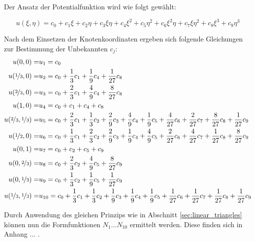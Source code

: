Der Ansatz der Potentialfunktion wird wie folgt gewählt:

\begin{equation}
\label{eq:cubic_triangle_eq}
u(\xi, \eta) = c_0 + c_1 \xi + c_2 \eta + c_3 \xi \eta + c_4 \xi^2 + c_5 \eta^2 + c_6 \xi^2 \eta + c_7 \xi \eta^2 + c_8 \xi^3 + c_9 \eta^3
\end{equation}	



Nach dem Einsetzen der Knotenkoordinaten ergeben sich folgende Gleichungen zur Bestimmung der Unbekannten $c_j$:
\begin{align}
u(0,0) = &u_1 = c_0\\
u(\nicefrac{1}{3}, 0) = &u_2 = c_0 + \frac{1}{3} c_1 + \frac{1}{9} c_4 +  \frac{1}{27} c_8\nonumber \\
u(\nicefrac{2}{3}, 0) = &u_3 = c_0 + \frac{2}{3} c_1 + \frac{4}{9} c_4 +  \frac{8}{27} c_8\nonumber \\
u(1,0) = &u_4 = c_0 + c_1 + c_4 + c_8\nonumber\\
u(\nicefrac{2}{3}, \nicefrac{1}{3}) = &u_5 = c_0 + \frac{2}{3} c_1 +  \frac{1}{3} c_2 + \frac{2}{9} c_3 +  \frac{4}{9} c_4 + \frac{1}{9} c_5 + \frac{4}{27} c_6 + \frac{2}{27} c_7 + \frac{8}{27} c_8 + \frac{1}{27} c_9\nonumber\\
u(\nicefrac{1}{2}, 0) = &u_6 = c_0 + \frac{1}{3} c_1 +  \frac{2}{3} c_2 + \frac{2}{9} c_3 +  \frac{1}{9} c_4 + \frac{4}{9} c_5 + \frac{2}{27} c_6 + \frac{4}{27} c_7 + \frac{1}{27} c_8 + \frac{8}{27} c_9\nonumber\\
u(0,1) = &u_7 = c_0 + c_2 + c_5 + c_9\nonumber\\
u(0, \nicefrac{2}{3}) = &u_8 = c_0 + \frac{2}{3} c_2 + \frac{4}{9} c_5 +  \frac{8}{27} c_9\nonumber \\
u(0, \nicefrac{1}{3}) = &u_9 = c_0 + \frac{1}{3} c_2 + \frac{1}{9} c_5 +  \frac{1}{27} c_9\nonumber \\
u(\nicefrac{1}{3}, \nicefrac{1}{3}) = &u_{10} = c_0 + \frac{1}{3} c_1 +  \frac{1}{3} c_2 + \frac{1}{9} c_3 +  \frac{1}{9} c_4 + \frac{1}{9} c_5 + \frac{1}{27} c_6 + \frac{1}{27} c_7 + \frac{1}{27} c_8 + \frac{1}{27} c_9\nonumber
\end{align}	
	

Durch Anwendung des gleichen Prinzips wie in Abschnitt \ref{sec:linear_triangles} können nun die Formfunktionen $N_1 \text{...} N_10$ ermittelt werden. Diese finden sich in Anhang ... .